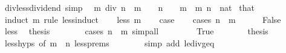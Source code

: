 \begin{isabellebody}
\endisatagproof
{\isafoldproof}%
%
\isadelimproof
\isanewline
%
\endisadelimproof
\isanewline
{}\isamarkupfalse%
\ div{\isacharunderscore}{\kern0pt}less{\isacharunderscore}{\kern0pt}dividend\ {\isacharbrackleft}{\kern0pt}simp{\isacharbrackright}{\kern0pt}{\isacharcolon}{\kern0pt}\isanewline
\ \ {\isachardoublequoteopen}m\ div\ n\ {\isacharless}{\kern0pt}\ m{\isachardoublequoteclose}\ \ {\isachardoublequoteopen}{}\ {\isacharless}{\kern0pt}\ n{\isachardoublequoteclose}\ \ {\isachardoublequoteopen}{}\ {\isacharless}{\kern0pt}\ m{\isachardoublequoteclose}\ \ m\ n\ {\isacharcolon}{\kern0pt}{\isacharcolon}{\kern0pt}\ nat\isanewline
%
\isadelimproof
%
\endisadelimproof
%
\isatagproof
{}\isamarkupfalse%
\ that\ \isamarkupfalse%
\ {\isacharparenleft}{\kern0pt}induct\ m\ rule{\isacharcolon}{\kern0pt}\ less{\isacharunderscore}{\kern0pt}induct{\isacharparenright}{\kern0pt}\isanewline
\ \ \isamarkupfalse%
\ {\isacharparenleft}{\kern0pt}less\ m{\isacharparenright}{\kern0pt}\isanewline
\ \ \isamarkupfalse%
\ {\isacharquery}{\kern0pt}case\isanewline
\ \ \isamarkupfalse%
\ {\isacharparenleft}{\kern0pt}cases\ {\isachardoublequoteopen}n\ {\isacharless}{\kern0pt}\ m{\isachardoublequoteclose}{\isacharparenright}{\kern0pt}\isanewline
\ \ \ \ \isamarkupfalse%
\ False\isanewline
\ \ \ \ \isamarkupfalse%
\ less\ \isamarkupfalse%
\ {\isacharquery}{\kern0pt}thesis\isanewline
\ \ \ \ \ \ \isamarkupfalse%
\ {\isacharparenleft}{\kern0pt}cases\ {\isachardoublequoteopen}n\ {\isacharequal}{\kern0pt}\ m{\isachardoublequoteclose}{\isacharparenright}{\kern0pt}\ simp{\isacharunderscore}{\kern0pt}all\isanewline
\ \ \isamarkupfalse%
\isanewline
\ \ \ \ \isamarkupfalse%
\ True\isanewline
\ \ \ \ \isamarkupfalse%
\ \isamarkupfalse%
\ {\isacharquery}{\kern0pt}thesis\isanewline
\ \ \ \ \ \ \isamarkupfalse%
\ less{\isachardot}{\kern0pt}hyps\ {\isacharbrackleft}{\kern0pt}of\ {\isachardoublequoteopen}m\ {\isacharminus}{\kern0pt}\ n{\isachardoublequoteclose}{\isacharbrackright}{\kern0pt}\ less{\isachardot}{\kern0pt}prems\isanewline
\ \ \ \ \ \ \isamarkupfalse%
\ {\isacharparenleft}{\kern0pt}simp\ add{\isacharcolon}{\kern0pt}\ le{\isacharunderscore}{\kern0pt}div{\isacharunderscore}{\kern0pt}geq{\isacharparenright}{\kern0pt}\isanewline
\ \ \isamarkupfalse%

\end{isabellebody}
